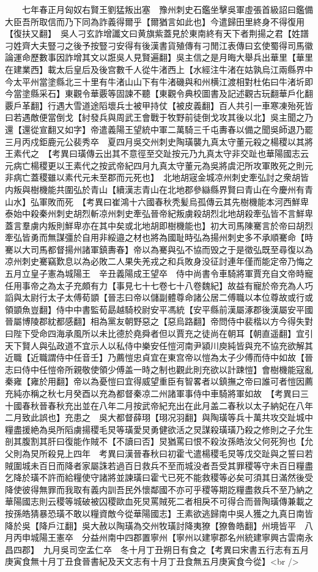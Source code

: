 　　七年春正月匈奴右賢王劉猛叛出塞　豫州刺史石鑑坐擊吳軍虛張首級詔曰鑑備大臣吾所取信而乃下同為詐義得爾乎【爾猶言如此也】今遣歸田里終身不得復用【復扶又翻】　吳人刁玄詐增讖文曰黄旗紫蓋見於東南終有天下者荆揚之君【姓譜刁姓齊大夫豎刁之後予按豎刁安得有後漢書貨殖傳有刁閒江表傳曰玄使蜀得司馬徽論運命歷數事因詐增其文以誑吳人見賢遍翻】吳主信之是月晦大舉兵出華里【華里在建業西】載太后皇后及後宫數千人從牛渚西上【水經注牛渚在姑孰烏江兩縣界中今太平州當塗縣北三十里有牛渚山山下有牛渚磯與和州横江渡相對杜佑曰牛渚圻即今當塗縣采石】東觀令華覈等固諫不聽【東觀令典校圖書及記述觀古玩翻華戶化翻覈戶革翻】行遇大雪道途䧟壞兵士被甲持仗【被皮義翻】百人共引一車寒凍殆死皆曰若遇敵便當倒戈【紂發兵與周武王會戰于牧野前徒倒戈攻其後以北】吳主聞之乃還【還從宣翻又如字】帝遣義陽王望統中軍二萬騎三千屯夀春以備之聞吳師退乃罷　三月丙戍鉅鹿元公裴秀卒　夏四月吳交州刺史陶璜襲九真太守董元殺之楊稷以其將王素代之　【考異曰璜傳云出其不意徑至交趾按元乃九真太守非交趾也華陽國志云元病亡楊稷更以王素代之按武帝紀四月九真太守董元為吳將虞汜所攻軍敗死之則元非病亡蓋稷雖以素代元未至郡而元死也】　北地胡宼金城凉州刺史牽弘討之衆胡皆内叛與樹機能共圍弘於青山【續漢志青山在北地郡參䜌縣界賢曰青山在今慶州有青山水】弘軍敗而死　【考異曰崔鴻十六國春秋秃髪烏孤傳云其先樹機能本河西鮮卑泰始中殺秦州刺史胡烈斬凉州刺史牽弘晉帝紀叛虜殺胡烈北地胡殺牽弘皆不言鮮卑蓋言羣虜内叛則鮮卑亦在其中矣或北地胡即樹機能也】初大司馬陳騫言於帝曰胡烈牽弘皆勇而無謀彊於自用非綏邉之材也將為國耻時弘為揚州刺史多不承順騫命【時騫以大司馬都督揚州諸軍鎮夀春】帝以為騫與弘不協而毁之于是徵弘既至尋復以為凉州刺史騫竊歎息以為必敗二人果失羌戎之和兵敗身没征討連年僅而能定帝乃悔之　五月立皇子憲為城陽王　辛丑義陽成王望卒　侍中尚書令車騎將軍賈充自文帝時寵任用事帝之為太子充頗有力【事見七十七卷七十八卷魏紀】故益有寵於帝充為人巧謟與太尉行太子太傅荀顗【晉志曰帝以儲副體尊命諸公居二傅職以本位尊故或行或領顗魚豈翻】侍中中書監荀勗越騎校尉安平馮統【安平縣前漢屬涿郡後漢屬安平國晉屬博陵郡紞都感翻】相為黨友朝野惡之【惡烏路翻】帝問侍中裴楷以方今得失對曰陛下受命四海承風所以未比德於堯舜者但以賈充之徒尚在朝耳【朝直遥翻】宜引天下賢人與弘政道不宜示人以私侍中樂安任愷河南尹潁川庾純皆與充不協充欲解其近職【近職謂侍中任音壬】乃薦愷忠貞宜在東宫帝以愷為太子少傅而侍中如故【晉志曰侍中任愷帝所親敬使領少傅盖一時之制也觀此則充欲以計踈愷】會樹機能寇亂秦雍【雍於用翻】帝以為憂愷曰宜得威望重臣有智畧者以鎮撫之帝曰誰可者愷因薦充純亦稱之秋七月癸酉以充為都督秦凉二州諸軍事侍中車騎將軍如故　【考異曰三十國春秋晉春秋充出並在八年二月按武帝紀充出在此月盖二春秋以太子納妃在八年二月致此誤也】充患之　吳大都督薛珝【珝况羽翻】與陶璜等兵十萬共攻交趾城中糧盡援絶為吳所䧟虜揚稷毛炅等璜愛炅勇健欲活之炅謀殺璜璜乃殺之修則之子允生剖其腹割其肝曰復能作賊不【不讀曰否】炅猶罵曰恨不殺汝孫皓汝父何死狗也【允父則為炅所殺見上四年　考異曰漢晉春秋曰初霍弋遣楊稷毛炅等戊交趾與之誓曰若賊圍城未百日而降者家屬誅若過百日救兵不至而城没者吾受其罪稷等守未百日糧盡乞降於璜不許而給糧使守諸將並諫璜曰霍弋已死不能救稷等必矣可須其日滿然後受降使彼得無罪而我取有義内訓吾民外懷鄰國不亦可乎稷等期訖糧盡救兵不至乃納之華陽國志則云稷等城破被囚稷歐血死炅罵賊死二者相戾不可得合而晉陶璜傳兼載之按孫皓猜暴恐璜不敢以糧資敵今從華陽國志】王素欲逃歸南中吳人獲之九真日南皆降於吳【降戶江翻】吳大赦以陶璜為交州牧璜討降夷獠【獠魯皓翻】州境皆平　八月丙申城陽王憲卒　分益州南中四郡置寧州【寧州以建寧郡名州統建寧興古雲南永昌四郡】　九月吳司空孟仁卒　冬十月丁丑朔日有食之【考異曰宋書五行志有五月庚寅食無十月丁丑食晉書紀及天文志有十月丁丑食無五月庚寅食今從】<br />

